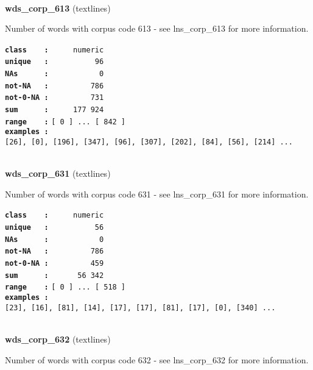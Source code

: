 \documentclass[]{article}
\begin{document}
~

\textbf{wds\_corp\_613} (textlines)

Number of words with corpus code 613 - see lns\_corp\_613 for more
information.

\textbf{\texttt{class\ \ \ \ :}} \texttt{~~~~~numeric}\\
\textbf{\texttt{unique\ \ \ :}} \texttt{~~~~~~~~~~96}\\
\textbf{\texttt{NAs\ \ \ \ \ \ :}} \texttt{~~~~~~~~~~~0}\\
\textbf{\texttt{not-NA\ \ \ :}} \texttt{~~~~~~~~~786}\\
\textbf{\texttt{not-0-NA\ :}} \texttt{~~~~~~~~~731}\\
\textbf{\texttt{sum\ \ \ \ \ \ :}} \texttt{~~~~~177~924}\\
\textbf{\texttt{range\ \ \ \ :}}
\texttt{{[}\ 0\ {]}\ ...\ {[}\ 842\ {]}}\\
\textbf{\texttt{examples\ :}}
\texttt{{[}26{]},\ {[}0{]},\ {[}196{]},\ {[}347{]},\ {[}96{]},\ {[}307{]},\ {[}202{]},\ {[}84{]},\ {[}56{]},\ {[}214{]}\ ...}\\

~

\textbf{wds\_corp\_631} (textlines)

Number of words with corpus code 631 - see lns\_corp\_631 for more
information.

\textbf{\texttt{class\ \ \ \ :}} \texttt{~~~~~numeric}\\
\textbf{\texttt{unique\ \ \ :}} \texttt{~~~~~~~~~~56}\\
\textbf{\texttt{NAs\ \ \ \ \ \ :}} \texttt{~~~~~~~~~~~0}\\
\textbf{\texttt{not-NA\ \ \ :}} \texttt{~~~~~~~~~786}\\
\textbf{\texttt{not-0-NA\ :}} \texttt{~~~~~~~~~459}\\
\textbf{\texttt{sum\ \ \ \ \ \ :}} \texttt{~~~~~~56~342}\\
\textbf{\texttt{range\ \ \ \ :}}
\texttt{{[}\ 0\ {]}\ ...\ {[}\ 518\ {]}}\\
\textbf{\texttt{examples\ :}}
\texttt{{[}23{]},\ {[}16{]},\ {[}81{]},\ {[}14{]},\ {[}17{]},\ {[}17{]},\ {[}81{]},\ {[}17{]},\ {[}0{]},\ {[}340{]}\ ...}\\

~

\textbf{wds\_corp\_632} (textlines)

Number of words with corpus code 632 - see lns\_corp\_632 for more
information.
\end{document}
